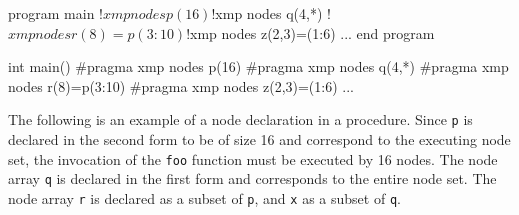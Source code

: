 
\vspace{0.5cm}

\begin{minipage}{0.45\hsize}
\begin{center}
\begin{Fexample}
      program main
!$xmp nodes p(16)
!$xmp nodes q(4,*)
!$xmp nodes r(8)=p(3:10)
!$xmp nodes z(2,3)=(1:6)
      ...       
      end program 
\end{Fexample}
\end{center}
\end{minipage}
%
\begin{minipage}{0.45\hsize}
\begin{center}
\begin{CexampleR}
int main() {
#pragma xmp nodes p(16)
#pragma xmp nodes q(4,*)
#pragma xmp nodes r(8)=p(3:10)
#pragma xmp nodes z(2,3)=(1:6)
    ...
}
\end{CexampleR}
\end{center}
\end{minipage}

\vspace{0.5cm}

%

The following is an example of a node declaration in a procedure.
Since {\tt p} is declared in the second form to be of size 16 and
correspond to the executing node set, the invocation of the {\tt foo}
function must be executed by 16 nodes.
%
The node array {\tt q} is declared in the first form and corresponds to
the entire node set. The node array {\tt r} is declared as a subset of
{\tt p}, and {\tt x} as a subset of {\tt q}.

